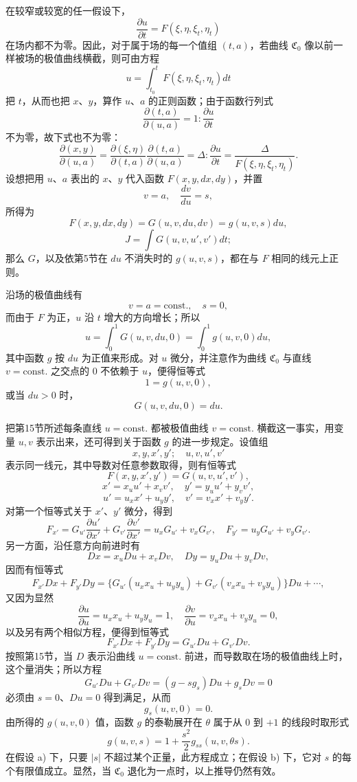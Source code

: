 \documentclass[11pt,a4paper,leqno]{article}
\begin{document}
在较窄或较宽的任一假设下，
\[
\frac{\partial u}{\partial t}=F(\xi,\eta,\xi_t,\eta_t)
\]
在场内都不为零。因此，对于属于场的每一个值组 $(t,a)$，若曲线 $\mathfrak{C}_0$ 像以前一样被场的极值曲线横截，则可由方程
\[
u=\int_{t_0}^{t}F(\xi,\eta,\xi_t,\eta_t)dt
\]
把 $t$，从而也把 $x$、$y$，算作 $u$、$a$ 的正则函数；由于函数行列式
\[
\frac{\partial(t,a)}{\partial(u,a)}=1:\frac{\partial u}{\partial t}
\]
不为零，故下式也不为零：
\begin{equation}\tag{36}
\frac{\partial(x,y)}{\partial(u,a)}
=\frac{\partial(\xi,\eta)}{\partial(t,a)}\frac{\partial(t,a)}{\partial(u,a)}
=\Delta:\frac{\partial u}{\partial t}
=\frac{\Delta}{F(\xi,\eta,\xi_t,\eta_t)}.
\end{equation}
设想把用 $u$、$a$ 表出的 $x$、$y$ 代入函数 $F(x,y,dx,dy)$，并置
\[
v=a,
\quad \frac{dv}{du}=s,
\]
所得为
\[
F(x,y,dx,dy)=G(u,v,du,dv)=g(u,v,s)du,
\]
\[
J=\int G(u,v,u',v')dt;
\]
那么 $G$，以及依第5节在 $du$ 不消失时的 $g(u,v,s)$，都在与 $F$ 相同的线元上正则。

沿场的极值曲线有
\[
v=a=\text{const.},\quad s=0,
\]
而由于 $F$ 为正，$u$ 沿 $t$ 增大的方向增长；所以
\[
u=\int_0^1G(u,v,du,0)=\int_0^1g(u,v,0)du,
\]
其中函数 $g$ 按 $du$ 为正值来形成。对 $u$ 微分，并注意作为曲线 $\mathfrak{C}_0$ 与直线 $v=\text{const.}$ 之交点的 0 不依赖于 $u$，便得恒等式
\[
1=g(u,v,0),
\]
或当 $du>0$ 时，
\[
G(u,v,du,0)=du.
\]

把第15节所述每条直线 $u=\text{const.}$ 都被极值曲线 $v=\text{const.}$ 横截这一事实，用变量 $u,v$ 表示出来，还可得到关于函数 $g$ 的进一步规定。设值组
\[
x,y,x',y';\quad u,v,u',v'
\]
表示同一线元，其中导数对任意参数取得，则有恒等式
\[
F(x,y,x',y')=G(u,v,u',v'),
\]
\[
x'=x_u u'+x_v v',\quad y'=y_u u'+y_v v',
\]
\[
u'=u_xx'+u_yy',\quad v'=v_xx'+v_yy'.
\]
对第一个恒等式关于 $x'$、$y'$ 微分，得到
\[
F_{x'}=G_{u'}\frac{\partial u'}{\partial x'}+G_{v'}\frac{\partial v'}{\partial x'}
=u_xG_{u'}+v_xG_{v'},
\quad F_{y'}=u_yG_{u'}+v_yG_{v'}.
\]
另一方面，沿任意方向前进时有
\[
Dx=x_uDu+x_vDv,
\quad Dy=y_uDu+y_vDv,
\]
因而有恒等式
\[
F_{x'}Dx+F_{y'}Dy
=\{G_{u'}(u_xx_u+u_yy_u)+G_{v'}(v_xx_u+v_yy_u)\}Du+\cdots,
\]
又因为显然
\[
\frac{\partial u}{\partial u}=u_xx_u+u_yy_u=1,
\quad
\frac{\partial v}{\partial u}=v_xx_u+v_yy_u=0,
\]
以及另有两个相似方程，便得到恒等式
\[
F_{x'}Dx+F_{y'}Dy=G_{u'}Du+G_{v'}Dv.
\]
按照第15节，当 $D$ 表示沿曲线 $u=\text{const.}$ 前进，而导数取在场的极值曲线上时，这个量消失；所以方程
\[
G_{u'}Du+G_{v'}Dv=(g-sg_s)Du+g_sDv=0
\]
必须由 $s=0$、$Du=0$ 得到满足，从而
\[
g_s(u,v,0)=0.
\]
由所得的 $g(u,v,0)$ 值，函数 $g$ 的泰勒展开在 $\theta$ 属于从 0 到 $+1$ 的线段时取形式
\begin{equation}\tag{37}
g(u,v,s)=1+\frac{s^2}{2}g_{ss}(u,v,\theta s).
\end{equation}
在假设 a) 下，只要 $|s|$ 不超过某个正量，此方程成立；在假设 b) 下，它对 $s$ 的每个有限值成立。显然，当 $\mathfrak{C}_0$ 退化为一点时，以上推导仍然有效。
\end{document}
